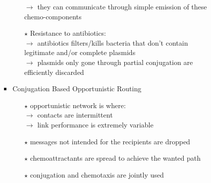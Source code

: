 \begin{itemize}
\begin{itemize}
\begin{itemize}
\begin{itemize}
\begin{enumerate}
\begin{enumerate}
                    \end{enumerate}
                    \hspace*{0.3cm}$\rightarrow$ they can communicate through simple emission of these\\
                    \hspace*{0.3cm}chemo-components
                    \item[$\star$] Resistance to antibiotics:\\[0.15cm]
                    \hspace*{0.3cm}$\rightarrow$ antibiotics filters/kills bacteria that don't contain\\
                    \hspace*{0.3cm}legitimate and/or complete plasmids\\[0.15cm]
                    \hspace*{0.3cm}$\rightarrow$ plasmids only gone through partial conjugation are\\
                    \hspace*{0.3cm}efficiently discarded
                \end{enumerate}
                \item Conjugation Based Opportunistic Routing
                \begin{enumerate}
                    \addtolength{\itemindent}{0.3cm}
                    \item[$\star$] opportunistic network is where:\\[0.15cm]
                    \hspace*{0.3cm}$\rightarrow$ contacts are intermittent\\[0.15cm]
                    \hspace*{0.3cm}$\rightarrow$ link performance is extremely variable
                    \item[$\star$] messages not intended for the recipients are dropped
                    \item[$\star$] chemoattractants are spread to achieve the wanted path
                    \item[$\star$] conjugation and chemotaxis are jointly used
                \end{enumerate}
            \end{itemize}
        \end{itemize}
    \end{itemize}
    \begin{figure}[!h] 
        \centering 

\end{figure}
\end{itemize}
